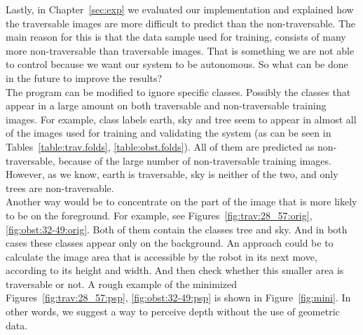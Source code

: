 \documentclass[12pt,a4paper,table,dvipsnames,tikz]{report}
\newcommand{\bl}[1]{{\hypersetup{linkcolor=blue}#1}}
\begin{document}
	Lastly, in Chapter~\ref{sec:exp} we evaluated our implementation and explained how 
	the traversable images are more difficult to predict than the non-traversable. The 
	main reason for this is that the data sample used for training, consists of many 
	more non-traversable than traversable images. That is something we are not able 
	to control because we want our system to be autonomous. So what can be done in the 
	future to improve the results?
	\\
	
	The program can be modified to ignore specific classes. Possibly the classes that 
	appear in a large amount on both traversable and non-traversable training images. 
	For example, class labels earth, sky and tree seem to appear in almost all of the 
	images used for training and validating the system (as can be seen in 
	Tables~\bl{\ref{table:trav.folds}, \ref{table:obst.folds}}). All of them are 
	predicted as non-traversable, because of the large number of non-traversable 
	training images. However, as we know, earth is traversable, sky is neither of the 
	two, and only trees are non-traversable. 
	\\
	
	Another way would be to concentrate on the part of the image that is more likely 
	to be on the foreground. For example, see Figures~\bl{\ref{fig:trav:28_57:orig}, 
	\ref{fig:obst:32-49:orig}}. Both of them contain the classes tree and sky. And in 
	both cases these classes appear only on the background. An approach could be to 
	calculate the image area that is accessible by the robot in its next move, according 
	to its height and width. And then check whether this smaller area is traversable 
	or not. A rough example of the minimized Figures~\bl{\ref{fig:trav:28_57:psp}, 
	\ref{fig:obst:32-49:psp}} is shown in Figure~\bl{\ref{fig:mini}}. In other words, 
	we suggest a way to perceive depth without the use of geometric data.
	\\
	
\end{document}
